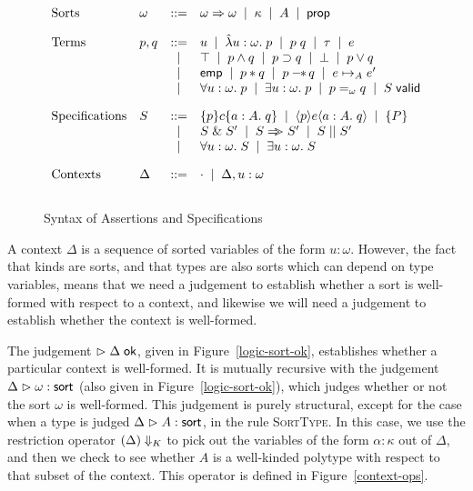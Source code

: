 \begin{figure}
\begin{displaymath}
\begin{array}{llcl}
\mbox{Sorts} & \omega & ::= & \omega \Rightarrow \omega \;\;|\;\; \kappa \;\;|\;\;
A \;\;|\;\; \mathsf{prop} \\[1em]

\mbox{Terms} & 
p,q & ::= & u \;\;|\;\; \hat{\lambda} u:\omega.\;p \;\;|\;\; p\;q \;\;|\;\; \tau \;\;|\;\; e \\
&   &  |  & \top \;\;|\;\; p \land q \;\;|\;\; p \supset q \;\;|\;\; \bot \;\;|\;\; p \vee q \\
&   &  |  & \mathsf{emp} \;\;|\;\; p * q \;\;|\;\; p -\!\!*\, q \;\;|\;\; e \mapsto_A e' \\
&   &  |  & \forall u:\omega.\; p \;\;|\;\; \exists u:\omega.\; p \;\;|\;\; p =_\omega q \;\;|\;\;
            {S}\;\mathsf{valid} \\[1em]

\mbox{Specifications} & 
S & ::= & \{{p}\}{c}\{{a:A}.\;{q}\} \;\;|\;\; \langle{p}\rangle{e}\langle{a:A}.\;{q}\rangle \;\;|\;\; \{{P}\} \\
& &  |  & S \;\&\; S' \;\;|\;\; S \Rightarrow\!\!\!> S' \;\;|\;\; S \;||\; S' \\
& &  |  & \forall u:\omega.\; S \;\;|\;\; \exists u:\omega.\; S \\[1em]

\mbox{Contexts} & 
\Delta & ::= & \cdot \;\;|\;\; \Delta, u:\omega \\[1em]
\end{array}
\end{displaymath}
\caption{Syntax of Assertions and Specifications}
\label{logic-syntax}  
\end{figure}



A context $\Delta$ is a sequence of sorted variables of the form
$u:\omega$. However, the fact that kinds are sorts, and that types are
also sorts which can depend on type variables, means that we need a
judgement to establish whether a sort is well-formed with respect to a
context, and likewise we will need a judgement to establish whether
the context is well-formed.

The judgement $\vartriangleright {\Delta} \;\mathsf{ok}$, given in
Figure~\ref{logic-sort-ok}, establishes whether a particular context
is well-formed. It is mutually recursive with the judgement
${{\Delta}} \vartriangleright {{\omega}} : {\mathsf{sort}}$ (also given in Figure~\ref{logic-sort-ok}), which
judges whether or not the sort $\omega$ is well-formed. This judgement
is purely structural, except for the case when a type is judged
${{\Delta}} \vartriangleright {{A}} : {\mathsf{sort}}$, in the rule \textsc{SortType}. In this case, we use
the restriction operator $({\Delta})\Downarrow_K$ to pick out the
variables of the form $\alpha:\kappa$ out of $\Delta$, and then we
check to see whether $A$ is a well-kinded polytype with respect to
that subset of the context. This operator is defined in
Figure~\ref{context-ops}. 

